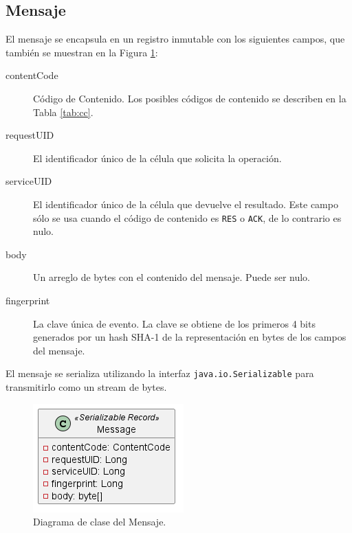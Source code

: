 \documentclass[conference,compsoc]{IEEEtran}
\begin{document}
\subsection{Mensaje}\label{sec:msg}

El mensaje se encapsula en un registro inmutable con los siguientes campos, que también se muestran en la Figura \ref{fig:message}:
\begin{description}
    \item[contentCode] Código de Contenido. Los posibles códigos de contenido se describen en la Tabla \ref{tab:cc}.
    \item[requestUID] El identificador único de la célula que solicita la operación.
    \item[serviceUID] El identificador único de la célula que devuelve el resultado. Este campo sólo se usa cuando el código de contenido es \texttt{RES} o \texttt{ACK}, de lo contrario es nulo.
    \item[body] Un arreglo de bytes con el contenido del mensaje. Puede ser nulo.
    \item[fingerprint] La clave única de evento. La clave se obtiene de los primeros 4 bits generados por un hash SHA-1 de la representación en bytes de los campos del mensaje.
\end{description}

El mensaje se serializa utilizando la interfaz \texttt{java.io.Serializable} para transmitirlo como un stream de bytes.

\begin{figure}[hbt]
    \centering
    \includegraphics[width=0.5\columnwidth]{message.png}
    \caption{Diagrama de clase del Mensaje.}
    \label{fig:message}
\end{figure}
\end{document}
